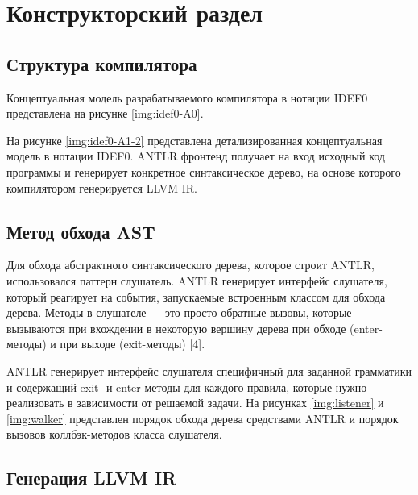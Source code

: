 \chapter{Конструкторский раздел}


\section{Структура компилятора}
Концептуальная модель разрабатываемого компилятора в нотации IDEF0 представлена на рисунке \ref{img:idef0-A0}.


На рисунке \ref{img:idef0-A1-2} представлена детализированная концептуальная модель в нотации IDEF0.
ANTLR фронтенд получает на вход исходный код программы и генерирует конкретное синтаксическое дерево, на основе которого компилятором генерируется LLVM IR.


\section{Метод обхода AST}

Для обхода абстрактного синтаксического дерева, которое строит ANTLR, использовался паттерн слушатель.
ANTLR генерирует интерфейс слушателя, который реагирует на события, запускаемые встроенным классом для обхода дерева.
Методы в слушателе — это просто обратные вызовы, которые вызываются при вхождении в некоторую вершину дерева при обходе (enter-методы) и при выходе (exit-методы) [4].

ANTLR генерирует интерфейс слушателя специфичный для заданной грамматики и содержащий exit- и enter-методы для каждого правила, которые нужно реализовать в зависимости от решаемой задачи.
На рисунках \ref{img:listener} и \ref{img:walker} представлен порядок обхода дерева средствами ANTLR и порядок вызовов коллбэк-методов класса слушателя.



\section{Генерация LLVM IR}

